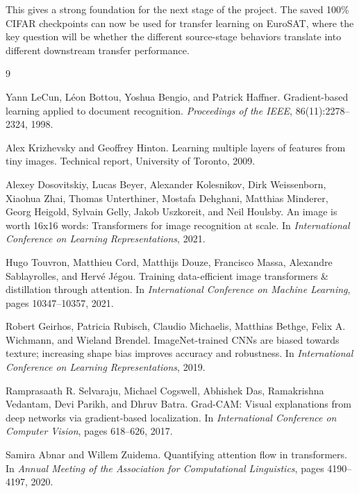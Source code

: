 \documentclass[11pt]{article}
\begin{document}
This gives a strong foundation for the next stage of the project. The saved 100\% CIFAR checkpoints can now be used for transfer learning on EuroSAT, where the key question will be whether the different source-stage behaviors translate into different downstream transfer performance.

\begin{thebibliography}{9}

Yann LeCun, Léon Bottou, Yoshua Bengio, and Patrick Haffner.
\newblock Gradient-based learning applied to document recognition.
\newblock \emph{Proceedings of the IEEE}, 86(11):2278--2324, 1998.

Alex Krizhevsky and Geoffrey Hinton.
\newblock Learning multiple layers of features from tiny images.
\newblock Technical report, University of Toronto, 2009.

Alexey Dosovitskiy, Lucas Beyer, Alexander Kolesnikov, Dirk Weissenborn, Xiaohua Zhai, Thomas Unterthiner, Mostafa Dehghani, Matthias Minderer, Georg Heigold, Sylvain Gelly, Jakob Uszkoreit, and Neil Houlsby.
\newblock An image is worth 16x16 words: Transformers for image recognition at scale.
\newblock In \emph{International Conference on Learning Representations}, 2021.

Hugo Touvron, Matthieu Cord, Matthijs Douze, Francisco Massa, Alexandre Sablayrolles, and Hervé Jégou.
\newblock Training data-efficient image transformers \& distillation through attention.
\newblock In \emph{International Conference on Machine Learning}, pages 10347--10357, 2021.

Robert Geirhos, Patricia Rubisch, Claudio Michaelis, Matthias Bethge, Felix A. Wichmann, and Wieland Brendel.
\newblock ImageNet-trained CNNs are biased towards texture; increasing shape bias improves accuracy and robustness.
\newblock In \emph{International Conference on Learning Representations}, 2019.

Ramprasaath R. Selvaraju, Michael Cogswell, Abhishek Das, Ramakrishna Vedantam, Devi Parikh, and Dhruv Batra.
\newblock Grad-CAM: Visual explanations from deep networks via gradient-based localization.
\newblock In \emph{International Conference on Computer Vision}, pages 618--626, 2017.

Samira Abnar and Willem Zuidema.
\newblock Quantifying attention flow in transformers.
\newblock In \emph{Annual Meeting of the Association for Computational Linguistics}, pages 4190--4197, 2020.

\end{thebibliography}
\end{document}
